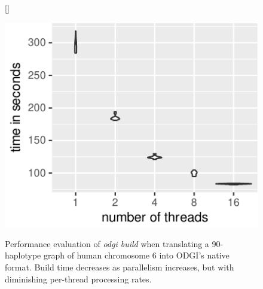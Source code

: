 \begin{figure}[ht!]
{}[\FBwidth]
         {\caption{Performance evaluation of \textit{odgi build} when translating a 90-haplotype graph of human chromosome 6 into ODGI's native format.
             Build time decreases as parallelism increases, but with diminishing per-thread processing rates.
           }\label{fig:build}}
         {\includegraphics[width=\linewidth]{fig/build/mean_build_time.pdf}} %
	
\end{figure}
